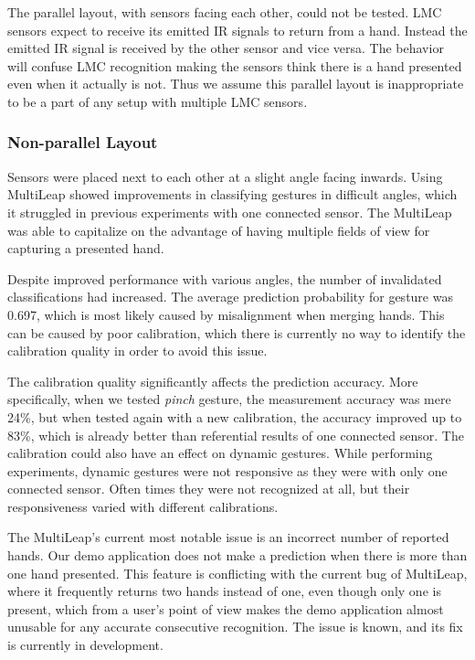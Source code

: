 The parallel layout, with sensors facing each other, could not be tested. LMC sensors expect to receive its emitted IR signals to return from a hand. Instead the emitted IR signal is received by the other sensor and vice versa. The behavior will confuse LMC recognition making the sensors think there is a hand presented even when it actually is not. Thus we assume this parallel layout is inappropriate to be a part of any setup with multiple LMC sensors.


\subsubsection{Non-parallel Layout}

Sensors were placed next to each other at a slight angle facing inwards. Using MultiLeap \cite{tomasMultileap} showed improvements in classifying gestures in difficult angles, which it struggled in previous experiments with one connected sensor. The MultiLeap was able to capitalize on the advantage of having multiple fields of view for capturing a presented hand.

Despite improved performance with various angles, the number of invalidated classifications had increased. The average prediction probability for gesture was 0.697, which is most likely caused by misalignment when merging hands. This can be caused by poor calibration, which there is currently no way to identify the calibration quality in order to avoid this issue. 

The calibration quality significantly affects the prediction accuracy. More specifically, when we tested \textit{pinch} gesture, the measurement accuracy was mere 24\%, but when tested again with a new calibration, the accuracy improved up to 83\%, which is already better than referential results of one connected sensor. The calibration could also have an effect on dynamic gestures. While performing experiments, dynamic gestures were not responsive as they were with only one connected sensor. Often times they were not recognized at all, but their responsiveness varied with different calibrations. 

The MultiLeap's current most notable issue is an incorrect number of reported hands. Our demo application does not make a prediction when there is more than one hand presented. This feature is conflicting with the current bug of MultiLeap, where it frequently returns two hands instead of one, even though only one is present, which from a user's point of view makes the demo application almost unusable for any accurate consecutive recognition. The issue is known, and its fix is currently in development.


